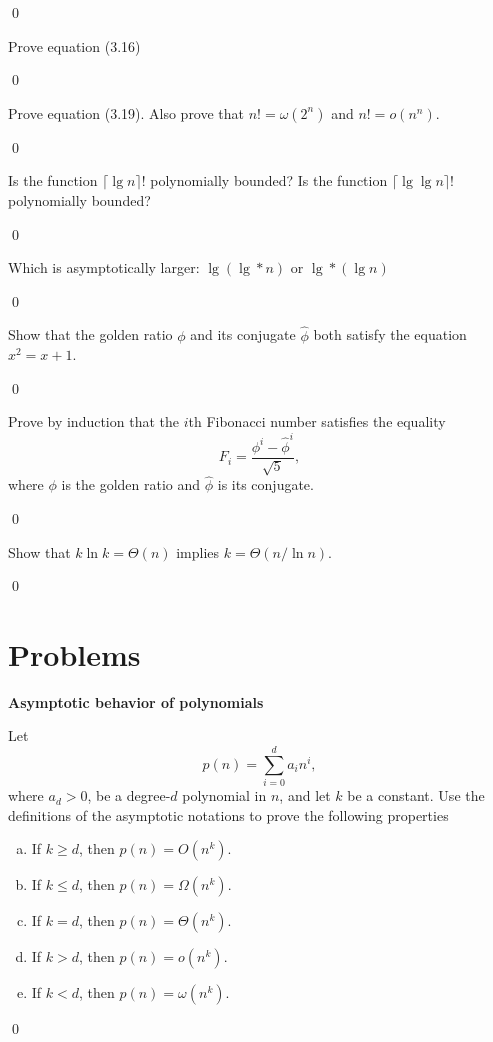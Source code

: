 \sol \qed

 Prove equation (3.16)

\pf \qed

 Prove equation (3.19). Also prove that $n! = \omega(2^n)$ and $n! = o(n^n)$.

\pf \qed

 Is the function $\lceil \lg n \rceil !$ polynomially bounded? Is the function $\lceil \lg \lg n \rceil !$ polynomially bounded?

\sol \qed

 Which is asymptotically larger: $\lg(\lg * n)$ or $\lg * (\lg n)$

\sol \qed

 Show that the golden ratio $\phi$ and its conjugate $\hat{\phi}$ both satisfy the equation $x^2 = x + 1$.

\sol \qed

 Prove by induction that the $i$th Fibonacci number satisfies the equality $$F_i = \frac{\phi^i - \hat{\phi}^i}{\sqrt{5}},$$ where $\phi$ is the golden ratio and $\hat{\phi}$ is its conjugate.

\pf \qed

 Show that $k \ln k = \Theta(n)$ implies $k = \Theta(n / \ln n)$.

\sol \qed

\section{Problems}

 \textbf{Asymptotic behavior of polynomials}

Let $$p(n) = \sum_{i=0}^d a_i n^i,$$ where $a_d > 0$, be a degree-$d$ polynomial in $n$, and let $k$ be a constant. Use the definitions of the asymptotic notations to prove the following properties

\begin{enumerate}[(a)]
    \item If $k \geq d$, then $p(n) = O(n^k)$.
    \item If $k \leq d$, then $p(n) = \Omega(n^k)$.
    \item If $k = d$, then $p(n) = \Theta(n^k)$.
    \item If $k > d$, then $p(n) = o(n^k)$.
    \item If $k < d$, then $p(n) = \omega(n^k)$.
\end{enumerate}

\sol \qed


